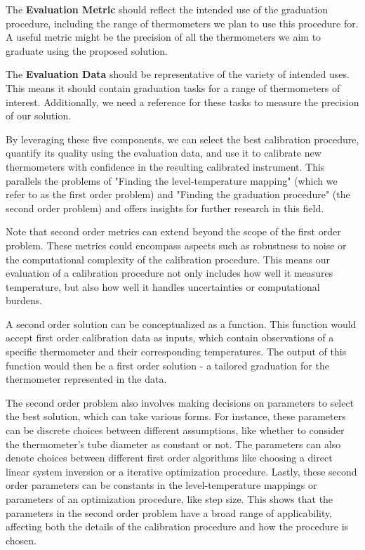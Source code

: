 \begin{bibunit}
The \textbf{Evaluation Metric} should reflect the intended use of the graduation procedure, including the range of thermometers we plan to use this procedure for. A useful metric might be the precision of all the thermometers we aim to graduate using the proposed solution.

The \textbf{Evaluation Data} should be representative of the variety of intended uses. This means it should contain graduation tasks for a range of thermometers of interest. Additionally, we need a reference for these tasks to measure the precision of our solution.

By leveraging these five components, we can select the best calibration procedure, quantify its quality using the evaluation data, and use it to calibrate new thermometers with confidence in the resulting calibrated instrument. This parallels the problems of "Finding the level-temperature mapping" (which we refer to as the first order problem) and "Finding the graduation procedure" (the second order problem) and offers insights for further research in this field.

Note that second order metrics can extend beyond the scope of the first order problem. These metrics could encompass aspects such as robustness to noise or the computational complexity of the calibration procedure. This means our evaluation of a calibration procedure not only includes how well it measures temperature, but also how well it handles uncertainties or computational burdens.

A second order solution can be conceptualized as a function. This function would accept first order calibration data as inputs, which contain observations of a specific thermometer and their corresponding temperatures. The output of this function would then be a first order solution - a tailored graduation for the thermometer represented in the data.

The second order problem also involves making decisions on parameters to select the best solution, which can take various forms. For instance, these parameters can be discrete choices between different assumptions, like whether to consider the thermometer's tube diameter as constant or not. The parameters can also denote choices between different first order algorithms like choosing a direct linear system inversion or a iterative optimization procedure. Lastly, these second order parameters can be constants in the level-temperature mappings or parameters of an optimization procedure, like step size. This shows that the parameters in the second order problem have a broad range of applicability, affecting both the details of the calibration procedure and how the procedure is chosen.



\end{bibunit}
